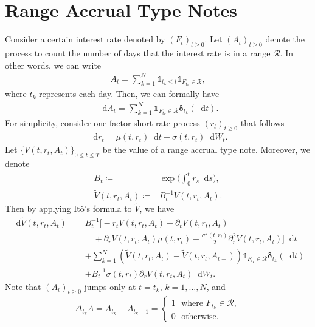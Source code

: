 \documentclass[onefignum,onetabnum]{siamart190516}
\numberwithin{equation}{section}
\newcommand{\1}{\mathds{1}}
\newcommand{\calR}{\mathcal{R}}
\newcommand{\Vt}{\tilde{V}}
\newcommand{\SUM}{\displaystyle\sum}
\newcommand*\df{\mathop{}\!\mathrm{d}}
\begin{document}
\section{Range Accrual Type Notes}
Consider a certain interest rate denoted by $(F_t)_{t\geq0}$.
Let $(A_t)_{t\geq0}$ denote the process to count the number of days that the
interest rate is in a range $\calR$. In other words, we can
write
\begin{align}
  A_t = \SUM_{k=1}^N \1_{t_k \leq t}\1_{F_{t_k} \in \calR}, \label{counting.process}
\end{align}
where $t_k$ represents each day. Then, we can formally have
\begin{align}
\df  A_t = \SUM_{k=1}^N  \1_{F_{t_k} \in \calR}\bm{\delta}_{t_k}(\df t).
\end{align}
For simplicity, consider  one factor short rate process $(r_t)_{t\geq0}$  that follows
\begin{align}
  \df r_t = \mu(t, r_t)\df t + \sigma(t, r_t)\df W_t.
\end{align}
Let $\{V(t, r_t, A_t)\}_{0\leq t\leq T}$ be the value of a range accrual type
note. Moreover, we denote
\begin{align}
  B_t \coloneqq& \exp\bigg(\int_{0}^{t}r_s\df s\bigg), \nonumber \\
  \Vt(t, r_t, A_t) \coloneqq&  B_t^{-1}V(t, r_t, A_t).\nonumber 
\end{align}
Then by applying It\^o's formula to $\Vt$, we have
\begin{align}
  \df\Vt(t, r_t, A_t) =
  & B_t^{-1}\Big[-r_tV(t, r_t, A_t) +\partial_tV(t, r_t, A_t)\nonumber \\
  &\quad +\partial_rV(t, r_t, A_t)\mu(t, r_t) +\frac{\sigma^2(t, r_t)}{2}\partial^2_rV(t, r_t, A_t)\Big]
    \df t \nonumber\\
    &+\SUM_{k=1}^N (\Vt(t, r_t, A_t) - \Vt(t, r_t, A_{t-}))\1_{F_{t_k} \in \calR}
      \bm{\delta}_{t_k}(\df t)\nonumber \\
  &+B^{-1}_t\sigma(t, r_t) \partial_rV(t, r_t, A_t)\df W_t. \label{eq1}
\end{align}
Note that $(A_t)_{t\geq0}$ jumps only at $t = t_k$, $k=1, \dots, N$,  and
\begin{align}
  \Delta_{t_k}A  = A_{t_k}-A_{t_k-1} =
  \begin{cases}
    1 ~~~ \text{where } F_{t_k} \in \calR, \\
    0 ~~~ \text{otherwise}.
  \end{cases}
\end{align}
\end{document}
